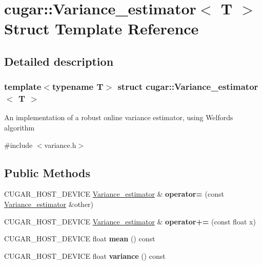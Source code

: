 \hypertarget{structcugar_1_1_variance__estimator}{}\section{cugar\+:\+:Variance\+\_\+estimator$<$ T $>$ Struct Template Reference}
\label{structcugar_1_1_variance__estimator}


\subsection{Detailed description}
\subsubsection*{template$<$typename T$>$\newline
struct cugar\+::\+Variance\+\_\+estimator$<$ T $>$}

An implementation of a robust online variance estimator, using Welford\textquotesingle{}s algorithm 

{\ttfamily \#include $<$variance.\+h$>$}

\subsection*{Public Methods}
\begin{DoxyCompactItemize}
\item 
\mbox{\label{structcugar_1_1_variance__estimator_a77434cbd63ef2496380fb60570229868}} 
C\+U\+G\+A\+R\+\_\+\+H\+O\+S\+T\+\_\+\+D\+E\+V\+I\+CE \hyperlink{structcugar_1_1_variance__estimator}{Variance\+\_\+estimator} \& {\bfseries operator=} (const \hyperlink{structcugar_1_1_variance__estimator}{Variance\+\_\+estimator} \&other)
\item 
\mbox{\label{structcugar_1_1_variance__estimator_a6c54bc1d74d494afc15fff5e7da82c1b}} 
C\+U\+G\+A\+R\+\_\+\+H\+O\+S\+T\+\_\+\+D\+E\+V\+I\+CE \hyperlink{structcugar_1_1_variance__estimator}{Variance\+\_\+estimator} \& {\bfseries operator+=} (const float x)
\item 
\mbox{\label{structcugar_1_1_variance__estimator_afdb744d3e0405ae6d4b64f635ec3e032}} 
C\+U\+G\+A\+R\+\_\+\+H\+O\+S\+T\+\_\+\+D\+E\+V\+I\+CE float {\bfseries mean} () const
\item 
\mbox{\label{structcugar_1_1_variance__estimator_aa68fe115c99d0e9f5045ad884eec2cff}} 
C\+U\+G\+A\+R\+\_\+\+H\+O\+S\+T\+\_\+\+D\+E\+V\+I\+CE float {\bfseries variance} () const
\end{DoxyCompactItemize}
